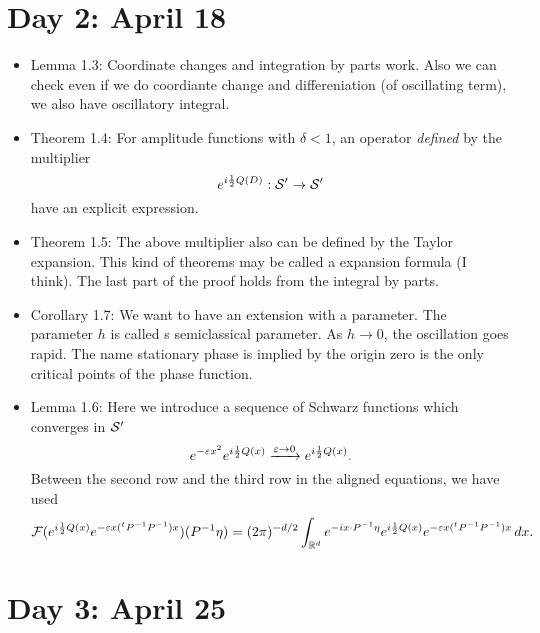 \documentclass{../../small}
\begin{document}
\section{Day 2: April 18}
\begin{itemize}
\item Lemma 1.3:
Coordinate changes and integration by parts work.
Also we can check even if we do coordiante change and differeniation (of oscillating term), we also have oscillatory integral.
\item Theorem 1.4:
For amplitude functions with $\delta<1$, an operator \emph{defined} by the multiplier
\[e^{i\frac12Q(D)}:\mathcal{S}'\to\mathcal{S}'\]
have an explicit expression.
\item Theorem 1.5:
The above multiplier also can be defined by the Taylor expansion.
This kind of theorems may be called a expansion formula (I think).
The last part of the proof holds from the integral by parts.
\item Corollary 1.7:
We want to have an extension with a parameter.
The parameter $h$ is called s semiclassical parameter.
As $h\to0$, the oscillation goes rapid.
The name stationary phase is implied by the origin zero is the only critical points of the phase function.
\item Lemma 1.6:
Here we introduce a sequence of Schwarz functions which converges in $\mathcal{S}'$
\[e^{-\varepsilon x^2}e^{i\frac12Q(x)}\xrightarrow{\varepsilon\to0}e^{i\frac12Q(x)}.\]
Between the second row and the third row in the aligned equations, we have used
\[\mathcal{F}(e^{i\frac12Q(x)}e^{-\varepsilon x({}^tP^{-1}P^{-1})x})(P^{-1}\eta)=(2\pi)^{-d/2}\int_{\mathbb{R}^d}e^{-ix\cdot P^{-1}\eta}e^{i\frac12Q(x)}e^{-\varepsilon x({}^tP^{-1}P^{-1})x}\,dx.\]
\end{itemize}

\newpage
\section{Day 3: April 25}
\end{document}
